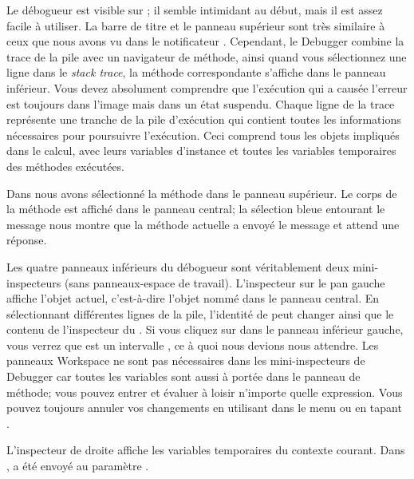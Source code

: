 \documentclass[a4paper,10pt,twoside]{book}
\begin{document}
Le d\'ebogueur est visible sur ; 
il semble intimidant au d\'ebut, mais il est assez facile \`a utiliser.
La barre de titre et le panneau sup\'erieur sont tr\`es similaire
\`a ceux que nous avons vu dans le notificateur .
Cependant, le Debugger combine la trace de la pile avec un navigateur de
m\'ethode, ainsi quand vous s\'electionnez une ligne dans le \emph{stack
trace}, la m\'ethode correspondante s'affiche dans le panneau inf\'erieur.
Vous devez absolument comprendre que l'ex\'ecution qui a caus\'ee l'erreur
est toujours dans l'image mais dans un \'etat suspendu.
Chaque ligne de la trace repr\'esente une tranche de la pile
d'ex\'ecution qui contient toutes les informations n\'ecessaires
pour poursuivre l'ex\'ecution. Ceci comprend tous les objets impliqu\'es
dans le calcul, avec leurs variables d'instance et toutes les variables
temporaires des m\'ethodes ex\'ecut\'ees.

Dans  nous avons s\'electionn\'e
la m\'ethode  dans le panneau sup\'erieur.
Le corps de la m\'ethode est affich\'e dans le panneau central;
la s\'election bleue entourant le message  nous montre
que la m\'ethode actuelle a envoy\'e le message  et
attend une r\'eponse.

Les quatre panneaux inf\'erieurs du d\'ebogueur sont v\'eritablement deux
mini-inspecteurs (sans panneaux-espace de travail).
L'inspecteur sur le pan gauche affiche l'objet actuel,
c'est-à-dire l'objet nomm\'e \self dans le panneau central.
En s\'electionnant diff\'erentes lignes de la pile, l'identit\'e de \self
peut changer ainsi que le contenu de
l'inspecteur du \self{}.
Si vous cliquez sur \self dans le panneau inf\'erieur gauche, vous verrez
que \self est un intervalle , ce \`a quoi nous devions
nous attendre.
Les panneaux Workspace ne sont pas n\'ecessaires dans les mini-inspecteurs
de Debugger car toutes les variables sont aussi \`a port\'ee dans
le panneau de m\'ethode; vous pouvez entrer et \'evaluer \`a loisir 
n'importe quelle expression.
Vous pouvez toujours annuler vos changements en utilisant 
 dans le menu ou en tapant . 

L'inspecteur de droite affiche les variables temporaires du contexte courant.
Dans ,
 a \'et\'e envoy\'e au param\`etre .
\end{document}
